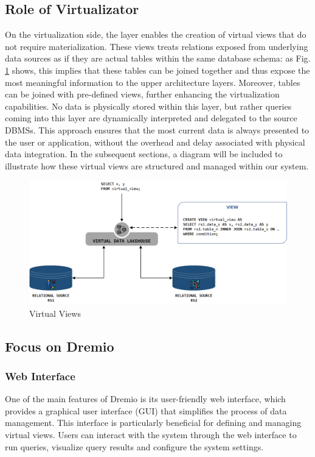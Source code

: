 \subsection{Role of Virtualizator}
On the virtualization side, the layer enables the creation of virtual views that do not require materialization. These views treats relations exposed from underlying data sources as if they are actual tables within the same database schema: as Fig. \ref{fig:virtual} shows, this implies that these tables can be joined together and thus expose the most meaningful information to the upper architecture layers. Moreover, tables can be joined with pre-defined views, further enhancing the virtualization capabilities. No data is physically stored within this layer, but rather queries coming into this layer are dynamically interpreted and delegated to the source \ac{DBMS}s. This approach ensures that the most current data is always presented to the user or application, without the overhead and delay associated with physical data integration. In the subsequent sections, a diagram will be included to illustrate how these virtual views are structured and managed within our system.
\begin{figure}[ht]
    \centering
    \includegraphics[width=15cm]{res/Drawing2.png}
    \caption{Virtual Views}
    \label{fig:virtual}
\end{figure}
\subsection{Focus on Dremio}
\subsubsection{Web Interface}
One of the main features of Dremio is its user-friendly web interface, which provides a graphical user interface (\ac{GUI}) that simplifies the process of data management. This interface is particularly beneficial for defining and managing virtual views. Users can interact with the system through the web interface to run queries, visualize query results and configure the system settings.

